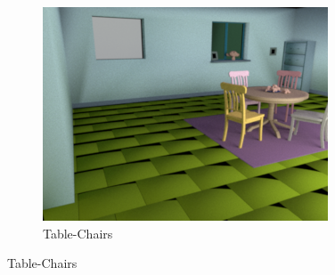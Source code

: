 \documentclass{jov}
\begin{document}
\begin{figure}[t]
\begin{subfigure}[b]{0.22 \textwidth}
        \includegraphics[width=\textwidth]{../Figures/Figure3/Figure3_c.png}
        \caption{Table-Chairs}
        \label{fig:baseSceneTableChairs}
    \end{subfigure}
    

\end{figure}
\end{document}
